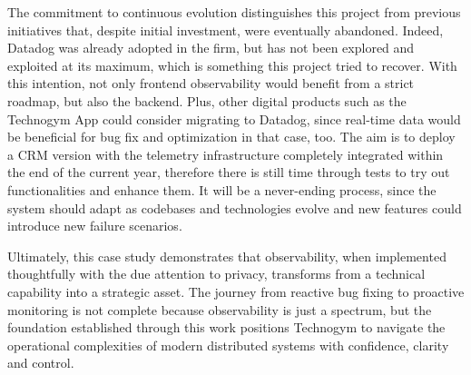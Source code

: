 \documentclass[12pt,a4paper,openright,twoside]{book}
\begin{document}
The commitment to continuous evolution distinguishes this project from previous initiatives that, despite initial investment, were eventually abandoned. Indeed, Datadog was already adopted in the firm, but has not been explored and exploited at its maximum, which is something this project tried to recover. With this intention, not only frontend observability would benefit from a strict roadmap, but also the backend. Plus, other digital products such as the Technogym App could consider migrating to Datadog, since real-time data would be beneficial for bug fix and optimization in that case, too. The aim is to deploy a CRM version with the telemetry infrastructure completely integrated within the end of the current year, therefore there is still time through tests to try out functionalities and enhance them. It will be a never-ending process, since the system should adapt as codebases and technologies evolve and new features could introduce new failure scenarios. 

Ultimately, this case study demonstrates that observability, when implemented thoughtfully with the due attention to privacy, transforms from a technical capability into a strategic asset. The journey from reactive bug fixing to proactive monitoring is not complete because observability is just a spectrum, but the foundation established through this work positions Technogym to navigate the operational complexities of modern distributed systems with confidence, clarity and control. 

\backmatter 



\end{document}
